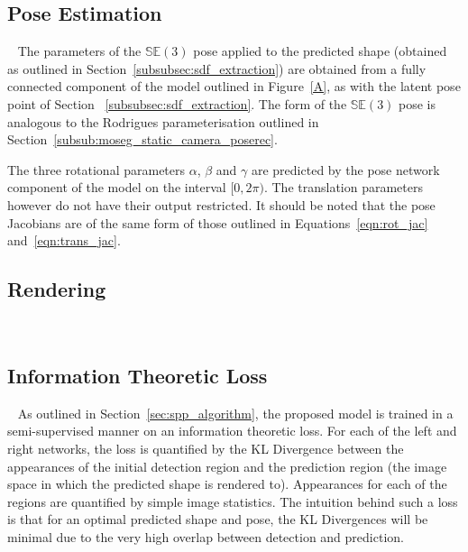 \subsection{Pose Estimation}
~\label{subsec:spp_pose_estim}
The parameters of the \( \mathbb{SE}(3) \) pose applied to the predicted shape (obtained 
as outlined in Section~\ref{subsubsec:sdf_extraction}) are obtained from a fully connected 
component of the model outlined in Figure~\ref{A}, as with the latent pose point of Section
~\ref{subsubsec:sdf_extraction}. The form of the \( \mathbb{SE}(3) \) pose is analogous to 
the Rodrigues parameterisation outlined in Section~\ref{subsub:moseg_static_camera_poserec}.

The three rotational parameters \( \alpha \), \( \beta \) and \( \gamma \) are predicted by 
the pose network component of the model on the interval \( [0, 2\pi) \). The translation parameters 
however do not have their output restricted. It should be noted that the pose Jacobians are of the 
same form of those outlined in Equations~\ref{eqn:rot_jac} and~\ref{eqn:trans_jac}.

\subsection{Rendering}
~\label{subsec:spp_rendering}

\subsection{Information Theoretic Loss}
~\label{subsec:spp_loss}
As outlined in Section~\ref{sec:spp_algorithm}, the proposed model is trained in a semi-supervised 
manner on an information theoretic loss. For each of the left and right networks, the loss is 
quantified by the KL Divergence between the appearances of the initial detection region and 
the prediction region (the image space in which the predicted shape is rendered to). Appearances for 
each of the regions are quantified by simple image statistics. The intuition behind such a loss is that 
for an optimal predicted shape and pose, the KL Divergences will be minimal due to the very high overlap 
between detection and prediction.

